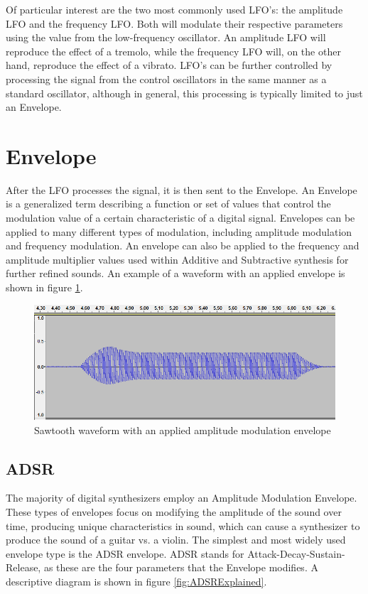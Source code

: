 \documentclass[a4paper,12pt]{report}
\begin{document}
Of particular interest are the two most commonly used LFO's: the amplitude LFO and the frequency LFO. Both will modulate their respective parameters using the value from the low-frequency oscillator. An amplitude LFO will reproduce the effect of a tremolo, while the frequency LFO will, on the other hand, reproduce the effect of a vibrato. LFO's can be further controlled by processing the signal from the control oscillators in the same manner as a standard oscillator, although in general, this processing is typically limited to just an Envelope.

\section{Envelope}
\label{sec:env}
After the LFO processes the signal, it is then sent to the Envelope. An Envelope is a generalized term describing a function or set of values that control the modulation value of a certain characteristic of a digital signal. Envelopes can be applied to many different types of modulation, including amplitude modulation and frequency modulation. An envelope can also be applied to the frequency and amplitude multiplier values used within Additive and Subtractive synthesis for further refined sounds. An example of a waveform with an applied envelope is shown in figure \ref{fig:ADSRWaveform}.

\begin{figure}
    \centering
    \includegraphics[width=36em]{ADSRWaveform.png}
    \caption{Sawtooth waveform with an applied amplitude modulation envelope}
    \label{fig:ADSRWaveform}
\end{figure}

\subsection{ADSR}
\label{subsec:adsr}
The majority of digital synthesizers employ an Amplitude Modulation Envelope. These types of envelopes focus on modifying the amplitude of the sound over time, producing unique characteristics in sound, which can cause a synthesizer to produce the sound of a guitar vs. a violin. The simplest and most widely used envelope type is the ADSR envelope. ADSR stands for Attack-Decay-Sustain-Release, as these are the four parameters that the Envelope modifies. A descriptive diagram is shown in figure \ref{fig:ADSRExplained}.
\end{document}
